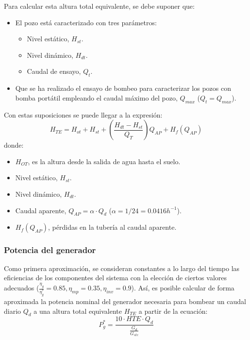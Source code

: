 Para calcular esta altura total equivalente, se debe suponer que:
\begin{itemize}
\item El pozo está caracterizado con tres parámetros:
\begin{itemize}
\item Nivel estático, \(H_{st}\).
\item Nivel dinámico, \(H_{dt}\).
\item Caudal de ensayo, \(Q_t\). 
\end{itemize}
\item Que se ha realizado el ensayo de bombeo para caracterizar los pozos con bomba portátil empleando el caudal máximo del pozo, \(Q_{max}\) (\(Q_t=Q_{max}\)).
\end{itemize}

Con estas suposiciones se puede llegar a la expresión:
\begin{equation}
H_{TE} = H_{ot} + H_{st} + \left( \frac{H_{dt} - H_{st}}{Q_T} \right) Q_{AP} + H_f(Q_{AP})
\end{equation}
donde:
\begin{itemize}
\item \(H_{OT}\), es la altura desde la salida de agua hasta el suelo.
\item Nivel estático, \(H_{st}\).
\item Nivel dinámico, \(H_{dt}\).
\item Caudal aparente, \(Q_{AP} = \alpha \cdot Q_d\)
(\(\alpha=1/24=0.0416h^{-1}\)).
\item \(H_f(Q_{AP})\), pérdidas en la tubería al caudal aparente.
\end{itemize}

\subsubsection{Potencia del generador}
\label{sec:org6813b0c}
Como primera aproximación, se consideran constantes a lo largo del tiempo las eficiencias de los componentes del sistema con la elección de ciertos valores adecuados (\(\frac{\eta_g}{\eta_g^*}=0.85, \eta_{mp}=0.35, \eta_{inv}=0.9\)). Así, es posible calcular de forma aproximada la potencia nominal del generador necesaria para bombear un caudal diario \(Q_d\) a una altura total equivalente \(H_{TE}\) a partir de la ecuación:
\begin{equation}
P^*_g = \frac{10 \cdot HTE \cdot Q_d}{\frac{G_d}{G_{stc}}}
\end{equation}

